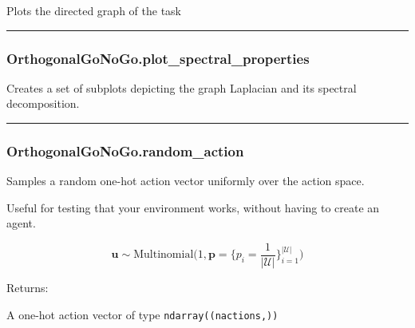 Plots the directed graph of the task

\begin{center}\rule{0.5\linewidth}{\linethickness}\end{center}

\subsubsection{OrthogonalGoNoGo.plot\_spectral\_properties}\label{orthogonalgonogo.plot_spectral_properties}

\begin{Shaded}
\begin{Highlighting}[]
\OperatorTok{=}\OperatorTok{=}\OperatorTok{=}\NormalTok{)}
\end{Highlighting}
\end{Shaded}

Creates a set of subplots depicting the graph Laplacian and its spectral
decomposition.

\begin{center}\rule{0.5\linewidth}{\linethickness}\end{center}

\subsubsection{OrthogonalGoNoGo.random\_action}\label{orthogonalgonogo.random_action}

\begin{Shaded}
\begin{Highlighting}[]
\NormalTok{)}
\end{Highlighting}
\end{Shaded}

Samples a random one-hot action vector uniformly over the action space.

Useful for testing that your environment works, without having to create
an agent.

\[
\mathbf u \sim \mathrm{Multinomial}\Big(1, \mathbf p=\{p_i = \frac{1}{|\mathcal U|}\}_{i=1}^{|\mathcal U|}\Big)
\]

Returns:

A one-hot action vector of type \texttt{ndarray((nactions,))}

